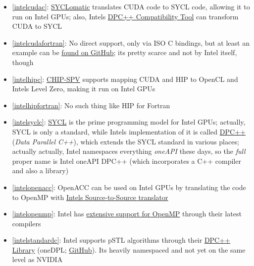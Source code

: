 \begin{frame}[allowframebreaks]
\begin{itemize}
        \item \ref{intelcudac}: \href{https://github.com/oneapi-src/SYCLomatic}{SYCLomatic} translates CUDA code to SYCL code, allowing it to run on Intel GPUs; also, Intel\textquotesingle s \href{https://www.intel.com/content/www/us/en/developer/tools/oneapi/dpc-compatibility-tool.html}{DPC++ Compatibility Tool} can transform CUDA to SYCL
        \item \ref{intelcudafortran}: No direct support, only via ISO C bindings, but at least an example can be \href{https://github.com/codeplaysoftware/SYCL-For-CUDA-Examples/tree/master/examples/fortran_interface}{found on GitHub}; it\textquotesingle s pretty scarce and not by Intel itself, though
        \item \ref{intelhipc}: \href{https://github.com/CHIP-SPV/chip-spv}{CHIP-SPV} supports mapping CUDA and HIP to OpenCL and Intel\textquotesingle s Level Zero, making it run on Intel GPUs
        \item \ref{intelhipfortran}: No such thing like HIP for Fortran
        \item \ref{intelsyclc}: \href{https://www.khronos.org/sycl/}{SYCL} is the prime programming model for Intel GPUs; actually, SYCL is only a standard, while Intel\textquotesingle s implementation of it is called \href{https://www.intel.com/content/www/us/en/developer/tools/oneapi/data-parallel-c-plus-plus.html}{DPC++} (\emph{Data Parallel C++}), which extends the SYCL standard in various places; actually actually, Intel namespaces everything \emph{oneAPI} these days, so the \emph{full} proper name is Intel oneAPI DPC++ (which incorporates a C++ compiler and also a library)
        \item \ref{intelopenacc}: OpenACC can be used on Intel GPUs by translating the code to OpenMP with \href{https://github.com/intel/intel-application-migration-tool-for-openacc-to-openmp}{Intel\textquotesingle s Source-to-Source translator}
        \item \ref{intelopenmp}: Intel has \href{https://www.intel.com/content/www/us/en/develop/documentation/get-started-with-cpp-fortran-compiler-openmp/top.html}{extensive support for OpenMP} through their latest compilers
        \item \ref{intelstandardc}: Intel supports pSTL algorithms through their \href{https://www.intel.com/content/www/us/en/developer/tools/oneapi/dpc-library.html\#gs.fifrh5}{DPC++ Library} (oneDPL; \href{https://github.com/oneapi-src/oneDPL}{GitHub}). It\textquotesingle s heavily namespaced and not yet on the same level as NVIDIA

\end{itemize}
\end{frame}
